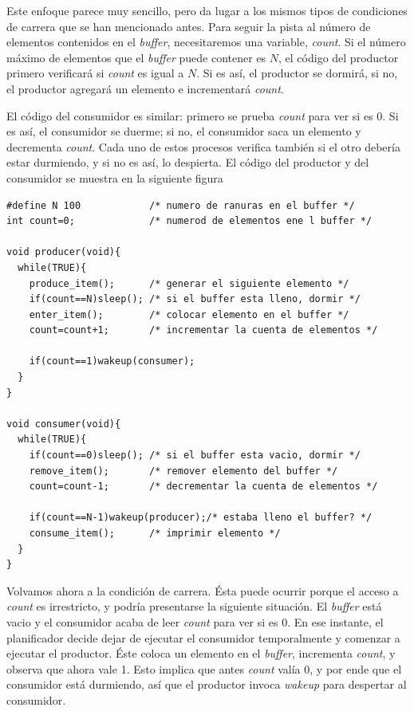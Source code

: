 \documentclass{article}
\begin{document}
Este enfoque parece muy sencillo, pero da lugar a los mismos tipos de 
condiciones de carrera que se han mencionado antes. Para seguir la pista 
al n\'umero de elementos contenidos en el {\it buffer}, necesitaremos una 
variable, {\it count}. Si el n\'umero m\'aximo de elementos que el 
{\it buffer} puede contener es $N$, el c\'odigo del productor primero 
verificar\'a si {\it count} es igual a $N$. Si es as\'i, el productor 
se dormir\'a, si no, el productor agregar\'a un elemento e incrementar\'a 
{\it count}.

El c\'odigo del consumidor es similar: primero se prueba {\it count} 
para ver si es 0. Si es as\'i, el consumidor se duerme; si no, el 
consumidor saca un elemento y decrementa {\it count}. Cada uno de estos 
procesos verifica tambi\'en si el otro deber\'ia estar durmiendo, y si 
no es as\'i, lo despierta. El c\'odigo del productor y del consumidor 
se muestra en la siguiente figura
\begin{verbatim}
#define N 100            /* numero de ranuras en el buffer */
int count=0;             /* numerod de elementos ene l buffer */

void producer(void){
  while(TRUE){
    produce_item();      /* generar el siguiente elemento */
    if(count==N)sleep(); /* si el buffer esta lleno, dormir */
    enter_item();        /* colocar elemento en el buffer */
    count=count+1;       /* incrementar la cuenta de elementos */

    if(count==1)wakeup(consumer);
  }
}

void consumer(void){
  while(TRUE){
    if(count==0)sleep(); /* si el buffer esta vacio, dormir */
    remove_item();       /* remover elemento del buffer */
    count=count-1;       /* decrementar la cuenta de elementos */

    if(count==N-1)wakeup(producer);/* estaba lleno el buffer? */
    consume_item();      /* imprimir elemento */
  }
}
\end{verbatim}
Volvamos ahora a la condici\'on de carrera. \'Esta puede ocurrir 
porque el acceso a {\it count} es irrestricto, y podr\'ia presentarse 
la siguiente situaci\'on. El {\it buffer} est\'a vacio y el consumidor 
acaba de leer {\it count} para ver si es 0. En ese instante, el 
planificador decide dejar de ejecutar el consumidor temporalmente y 
comenzar a ejecutar el productor. \'Este coloca un elemento en el 
{\it buffer}, incrementa {\it count}, y observa que ahora vale 1. 
Esto implica que antes {\it count} val\'ia 0, y por ende que el 
consumidor est\'a durmiendo, as\'i que el productor invoca {\it wakeup} 
para despertar al consumidor.
\end{document}
